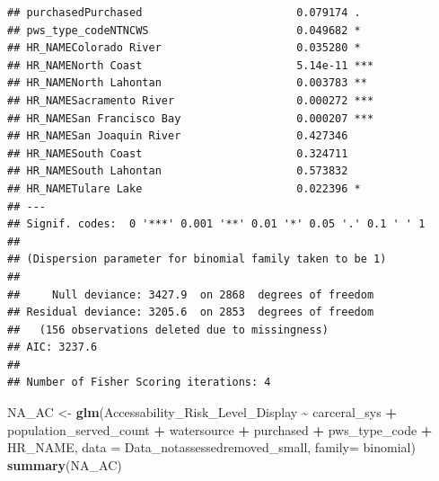 \documentclass[
]{article}
\newenvironment{Shaded}{\begin{snugshade}}{\end{snugshade}}
\newcommand{\AttributeTok}[1]{\textcolor[rgb]{0.13,0.29,0.53}{#1}}
\newcommand{\FunctionTok}[1]{\textcolor[rgb]{0.13,0.29,0.53}{\textbf{#1}}}
\newcommand{\NormalTok}[1]{#1}
\newcommand{\OtherTok}[1]{\textcolor[rgb]{0.56,0.35,0.01}{#1}}
\newcommand{\SpecialCharTok}[1]{\textcolor[rgb]{0.81,0.36,0.00}{\textbf{#1}}}
\begin{document}
\begin{verbatim}
## purchasedPurchased                        0.079174 .  
## pws_type_codeNTNCWS                       0.049682 *  
## HR_NAMEColorado River                     0.035280 *  
## HR_NAMENorth Coast                        5.14e-11 ***
## HR_NAMENorth Lahontan                     0.003783 ** 
## HR_NAMESacramento River                   0.000272 ***
## HR_NAMESan Francisco Bay                  0.000207 ***
## HR_NAMESan Joaquin River                  0.427346    
## HR_NAMESouth Coast                        0.324711    
## HR_NAMESouth Lahontan                     0.573832    
## HR_NAMETulare Lake                        0.022396 *  
## ---
## Signif. codes:  0 '***' 0.001 '**' 0.01 '*' 0.05 '.' 0.1 ' ' 1
## 
## (Dispersion parameter for binomial family taken to be 1)
## 
##     Null deviance: 3427.9  on 2868  degrees of freedom
## Residual deviance: 3205.6  on 2853  degrees of freedom
##   (156 observations deleted due to missingness)
## AIC: 3237.6
## 
## Number of Fisher Scoring iterations: 4
\end{verbatim}

\begin{Shaded}
\begin{Highlighting}[]
\NormalTok{NA\_AC }\OtherTok{\textless{}{-}} \FunctionTok{glm}\NormalTok{(Accessability\_Risk\_Level\_Display }\SpecialCharTok{\textasciitilde{}}\NormalTok{ carceral\_sys }\SpecialCharTok{+}\NormalTok{ population\_served\_count }\SpecialCharTok{+}\NormalTok{ watersource }\SpecialCharTok{+}\NormalTok{ purchased }\SpecialCharTok{+}\NormalTok{ pws\_type\_code }\SpecialCharTok{+}\NormalTok{ HR\_NAME, }\AttributeTok{data =}\NormalTok{ Data\_notassessedremoved\_small, }\AttributeTok{family=}\NormalTok{ binomial)}
\FunctionTok{summary}\NormalTok{(NA\_AC)}
\end{Highlighting}
\end{Shaded}
\end{document}
